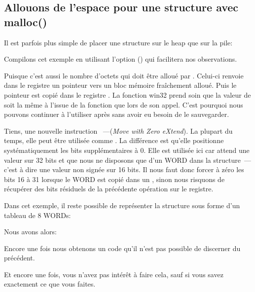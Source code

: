 ﻿\subsection{Allouons de l'espace pour une structure avec malloc()}
\label{struct_malloc_example}

Il est parfois plus simple de placer une structure sur le \gls{heap} que sur la pile:



Compilons cet exemple en utilisant l'option (\Ox) qui facilitera nos observations.




Puisque  c'est aussi le nombre d'octets qui doit être alloué par
. Celui-ci renvoie dans le registre \EAX un pointeur vers un bloc mémoire fraîchement
alloué. Puis le pointeur est copié dans le registre \ESI.
La fonction win32  prend soin que la valeur de \ESI soit la même à l'issue de la
fonction que lors de son appel. C'est pourquoi nous pouvons continuer à l'utiliser après sans avoir
eu besoin de le sauvegarder.


Tiens, une nouvelle instruction ~---\MOVZX (\emph{Move with Zero eXtend}).
La plupart du temps, elle peut être utilisée comme \MOVSX. La différence est qu'elle positionne
systématiquement les bits supplémentaires à 0.
Elle est utilisée ici car \printf attend une valeur sur 32 bits et que nous ne disposons que d'un
WORD dans la structure~---c'est à dire une valeur non signée sur 16 bits. Il nous faut donc forcer
à zéro les bits 16 à 31 lorsque le WORD est copié dans un \Tint{}, sinon nous risquons de
récupérer des bits résiduels de la précédente opération sur le registre.

Dans cet exemple, il reste possible de représenter la structure sous forme d'un tableau de 8 WORDs:



Nous avons alors:



Encore une fois nous obtenons un code qu'il n'est pas possible de discerner du précédent.

Et encore une fois, vous n'avez pas intérêt à faire cela, sauf si vous savez exactement ce que vous
faites.

